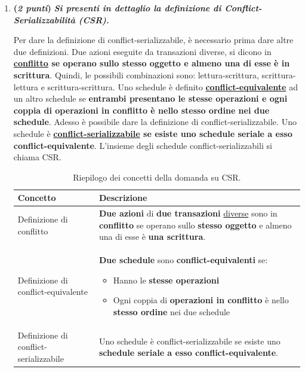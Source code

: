 \documentclass[a4paper]{article}
\begin{document}
\begin{enumerate}
		\item \textbf{(\emph{2 punti})} \textcolor{Green4}{\textbf{\emph{Si presenti in dettaglio la definizione di Conflict-Serializzabilità (CSR).}}}\label{dom: CSR - Conflict-Serializzabilità}
		
		Per dare la definizione di conflict-serializzabile, è necessario prima dare altre due definizioni. Due azioni eseguite da transazioni diverse, si dicono in \textbf{\underline{conflitto} se operano sullo stesso oggetto e almeno una di esse è in scrittura}. Quindi, le possibili combinazioni sono: lettura-scrittura, scrittura-lettura e scrittura-scrittura.\newline
		Uno schedule è definito \textbf{\underline{conflict-equivalente}} ad un altro schedule se \textbf{entrambi presentano le stesse operazioni e ogni coppia di operazioni in conflitto è nello stesso ordine nei due schedule}.\newline
		Adesso è possibile dare la definizione di conflict-serializzabile. Uno schedule è \textbf{\underline{conflict-serializzabile} se esiste uno schedule seriale a esso conflict-equivalente}. L'insieme degli schedule conflict-serializzabili si chiama CSR.
		
		\begin{table}[!htp]
			\centering
			\begin{tabular}{@{} l p{20em} @{}}
				\toprule
				Concetto & Descrizione \\
				\midrule
				Definizione di conflitto				& \textbf{Due azioni} di \textbf{due transazioni} \underline{diverse} sono in \textbf{conflitto} se operano sullo \textbf{stesso oggetto} e almeno una di esse è \textbf{una scrittura}. \\ [.7em]
				Definizione di conflict-equivalente		& \textbf{Due schedule} sono \textbf{conflict-equivalenti} se:
				\begin{itemize}
					\item Hanno le \textbf{stesse operazioni}
					\item Ogni coppia di \textbf{operazioni in conflitto} è nello \textbf{stesso ordine} nei due schedule
				\end{itemize}\\ [.7em]
				Definizione di conflict-serializzabile	& Uno schedule è conflict-serializzabile se esiste uno \textbf{schedule seriale a esso conflict-equivalente}. \\
				\bottomrule
			\end{tabular}
			\caption{Riepilogo dei concetti della domanda su CSR.}
		\end{table}\newpage
		

\end{enumerate}
\end{document}
